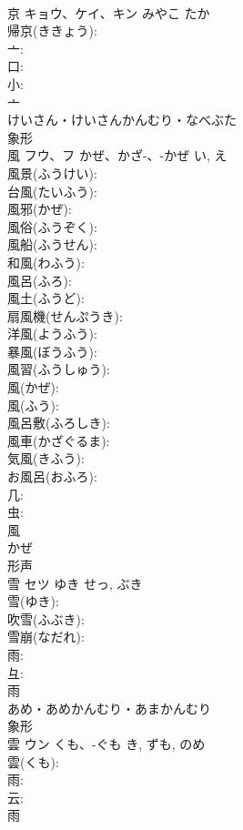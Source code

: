 \documentclass[8pt]{extreport}
\begin{document}
\begin{CJK}{UTF8}{min}
\\	京	キョウ、ケイ、キン	みやこ	たか	
\\	帰京(ききょう): 
\\	亠: 
\\	口: 
\\	小: 
\\	亠	
\\	けいさん・けいさんかんむり・なべぶた	
\\	象形 
\\	風	フウ、フ	かぜ、かざ-、-かぜ	い, え	
\\	風景(ふうけい): 
\\	台風(たいふう): 
\\	風邪(かぜ): 
\\	風俗(ふうぞく): 
\\	風船(ふうせん): 
\\	和風(わふう): 
\\	風呂(ふろ): 
\\	風土(ふうど): 
\\	扇風機(せんぷうき): 
\\	洋風(ようふう): 
\\	暴風(ぼうふう): 
\\	風習(ふうしゅう): 
\\	風(かぜ): 
\\	風(ふう): 
\\	風呂敷(ふろしき): 
\\	風車(かざぐるま): 
\\	気風(きふう): 
\\	お風呂(おふろ): 
\\	几: 
\\	虫: 
\\	風	
\\	かぜ	
\\	形声 
\\	雪	セツ	ゆき	せっ, ぶき	
\\	雪(ゆき): 
\\	吹雪(ふぶき): 
\\	雪崩(なだれ): 
\\	雨: 
\\	彑: 
\\	雨	
\\	あめ・あめかんむり・あまかんむり	
\\	象形 
\\	雲	ウン	くも、-ぐも	き, ずも, のめ	
\\	雲(くも): 
\\	雨: 
\\	云: 
\\	雨	

\end{CJK}
\end{document}
